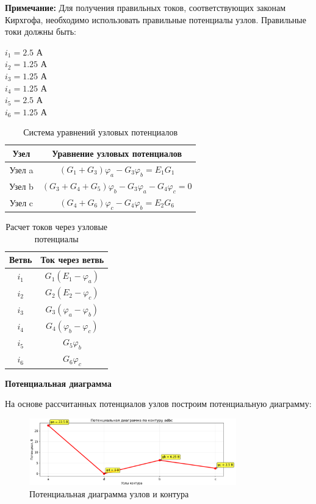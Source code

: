 \textbf{Примечание:} Для получения правильных токов, соответствующих законам Кирхгофа, необходимо использовать правильные потенциалы узлов. Правильные токи должны быть:
\begin{flushleft}
$i_1 = 2.5$ А \\
$i_2 = 1.25$ А \\
$i_3 = 1.25$ А \\
$i_4 = 1.25$ А \\
$i_5 = 2.5$ А \\
$i_6 = 1.25$ А
\end{flushleft}
\begin{table}[H]
\centering
\begin{tabular}{|c|c|}
\hline
\textbf{Узел} & \textbf{Уравнение узловых потенциалов} \\
\hline
Узел a & $(G_1 + G_3)\varphi_a - G_3\varphi_b = E_1 G_1$ \\
\hline
Узел b & $(G_3 + G_4 + G_5)\varphi_b - G_3\varphi_a - G_4\varphi_c = 0$ \\
\hline
Узел c & $(G_4 + G_6)\varphi_c - G_4\varphi_b = E_2 G_6$ \\
\hline
\end{tabular}
\caption{Система уравнений узловых потенциалов}
\label{tab:nodal_potential_equations}
\end{table}

\begin{table}[H]
\centering
\begin{tabular}{|c|c|}
\hline
\textbf{Ветвь} & \textbf{Ток через ветвь} \\
\hline
$i_1$ & $G_1(E_1 - \varphi_a)$ \\
\hline
$i_2$ & $G_2(E_2 - \varphi_c)$ \\
\hline
$i_3$ & $G_3(\varphi_a - \varphi_b)$ \\
\hline
$i_4$ & $G_4(\varphi_b - \varphi_c)$ \\
\hline
$i_5$ & $G_5\varphi_b$ \\
\hline
$i_6$ & $G_6\varphi_c$ \\
\hline
\end{tabular}
\caption{Расчет токов через узловые потенциалы}
\label{tab:nodal_current_calculations}
\end{table}

\textbf{Потенциальная диаграмма}

На основе рассчитанных потенциалов узлов построим потенциальную диаграмму:

\begin{figure}[H]
\centering
\includegraphics[width=0.8\textwidth]{images/exanple_potential_diagram.png}
\caption{Потенциальная диаграмма узлов и контура}
\label{fig:potential_diagram}
\end{figure}

